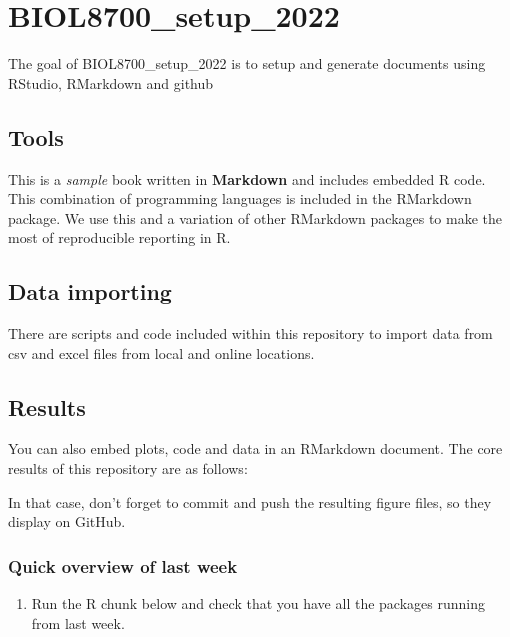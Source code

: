 \documentclass[
]{book}
\providecommand{\tightlist}{%
  \setlength{\itemsep}{0pt}\setlength{\parskip}{0pt}}
\begin{document}
\hypertarget{biol8700_setup_2022}{%
\chapter{BIOL8700\_setup\_2022}\label{biol8700_setup_2022}}

The goal of BIOL8700\_setup\_2022 is to setup and generate documents using RStudio, RMarkdown and github

\hypertarget{tools}{%
\section{Tools}\label{tools}}

This is a \emph{sample} book written in \textbf{Markdown} and includes embedded R code. This combination of programming languages is included in the RMarkdown package. We use this and a variation of other RMarkdown packages to make the most of reproducible reporting in R.

\hypertarget{data-importing}{%
\section{Data importing}\label{data-importing}}

There are scripts and code included within this repository to import data from csv and excel files from local and online locations.

\hypertarget{results}{%
\section{Results}\label{results}}

You can also embed plots, code and data in an RMarkdown document. The core results of this repository are as follows:

In that case, don't forget to commit and push the resulting figure files, so they display on GitHub.

\hypertarget{quick-overview-of-last-week}{%
\subsection{Quick overview of last week}\label{quick-overview-of-last-week}}

\begin{enumerate}
\def\labelenumi{\arabic{enumi}.}
\tightlist
\item
  Run the R chunk below and check that you have all the packages running from last week.
\end{enumerate}
\end{document}
